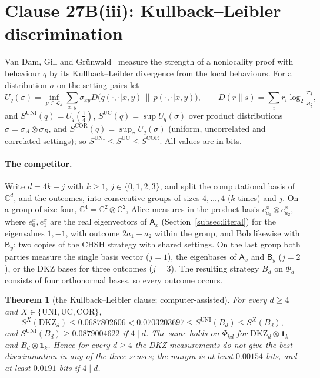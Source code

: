 \documentclass[11pt]{article}
\newtheorem{theorem}{Theorem}
\theoremstyle{remark}
\numberwithin{equation}{section}
\newcommand{\C}{\mathbb{C}}
\newcommand{\one}{\mathbf{1}}
\newcommand{\cL}{\mathcal{L}}
\newcommand{\DKZ}{\mathrm{DKZ}}
\newcommand{\UNI}{\mathrm{UNI}}
\newcommand{\UC}{\mathrm{UC}}
\newcommand{\COR}{\mathrm{COR}}
\newcommand{\sA}{\mathsf{A}}
\newcommand{\sB}{\mathsf{B}}
\begin{document}
\section{Clause 27B(iii): Kullback--Leibler discrimination}\label{sec:kl}

Van Dam, Gill and Gr\"unwald~\cite{vDGG} measure the strength of a nonlocality proof with behaviour $q$ by its
Kullback--Leibler divergence from the local behaviours. For a distribution $\sigma$ on the setting pairs let
\[
U_q(\sigma)=\inf_{p\in\cL_d}\sum_{x,y}\sigma_{xy}D\bigl(q(\cdot,\cdot|x,y)\,\big\|\,p(\cdot,\cdot|x,y)\bigr),\qquad
D(r\|s)=\sum_ir_i\log_2\frac{r_i}{s_i},
\]
and $S^{\UNI}(q)=U_q(\frac14)$, $S^{\UC}(q)=\sup U_q(\sigma)$ over product distributions $\sigma=\sigma_A\otimes\sigma_B$,
and $S^{\COR}(q)=\sup_\sigma U_q(\sigma)$ (uniform, uncorrelated and correlated settings); so $S^{\UNI}\le S^{\UC}\le
S^{\COR}$. All values are in bits.

\paragraph{The competitor.}
Write $d=4k+j$ with $k\ge1$, $j\in\{0,1,2,3\}$, and split the computational basis of $\C^d$, and the outcomes, into
consecutive groups of sizes $4,\dots,4$ ($k$ times) and $j$. On a group of size four, $\C^4=\C^2\otimes\C^2$, Alice
measures in the product basis $e^x_{a_1}\otimes e^x_{a_2}$, where $e^x_0,e^x_1$ are the real eigenvectors of $\sA_x$
(Section~\ref{subsec:literal}) for the eigenvalues $1,-1$, with outcome $2a_1+a_2$ within the group, and Bob likewise
with $\sB_y$: two copies of the CHSH strategy with shared settings. On the last group both parties measure the single
basis vector ($j=1$), the eigenbases of $\sA_x$ and $\sB_y$ ($j=2$), or the DKZ bases for three outcomes ($j=3$). The
resulting strategy $B_d$ on $\Phi_d$ consists of four orthonormal bases, so every outcome occurs.

\begin{theorem}[the Kullback--Leibler clause; computer-assisted]\label{thm:kl}
For every $d\ge4$ and $X\in\{\UNI,\UC,\COR\}$,
\[
S^X(\DKZ_d)\le0.0687802606<0.0703203697\le S^{\UNI}(B_d)\le S^X(B_d),
\]
and $S^{\UNI}(B_d)\ge0.0879004622$ if $4\mid d$. The same holds on $\Phi_{kd}$ for $\DKZ_d\otimes\one_k$ and
$B_d\otimes\one_k$. Hence for every $d\ge4$ the DKZ measurements do not give the best discrimination in any of the three
senses; the margin is at least $0.00154$ bits, and at least $0.0191$ bits if $4\mid d$.
\end{theorem}
\end{document}
